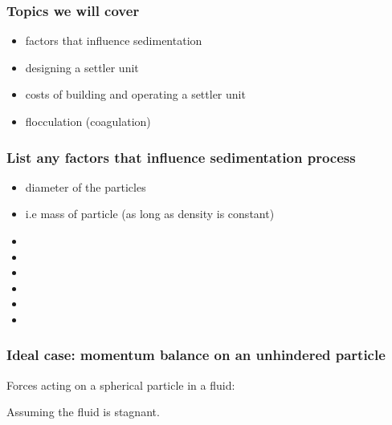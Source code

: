 \begin{frame}\frametitle{Topics we will cover}
	\begin{itemize}
		\item	factors that influence sedimentation
		\item	designing a settler unit
		\item	costs of building and operating a settler unit
		\item	flocculation (coagulation)
	\end{itemize}
\end{frame}

\begin{frame}\frametitle{List any factors that influence sedimentation process}
	\begin{itemize}
		\item	diameter of the particles
		\item	i.e mass of particle (as long as density is constant)
		\pause
		\item	\iftoggle{instructor}{strength of gravitational field}{}
		\item	\iftoggle{instructor}{relative density of particle vs fluid}{}
		\item	\iftoggle{instructor}{density of fluid}{}
		\item	\iftoggle{instructor}{viscosity of fluid}{}
		\item	\iftoggle{instructor}{particle concentration (hindered)}{}
		\item	\iftoggle{instructor}{{\color{myRed}{no effect}}: \textbf{diameter of the vessel} (or area)... to a point}{}
	\end{itemize}
\end{frame}

\begin{frame}\frametitle{Ideal case: momentum balance on an unhindered particle}
	Forces acting on a spherical particle in a fluid:

	\vspace{7.5cm}
	Assuming the fluid is stagnant.
\end{frame}

